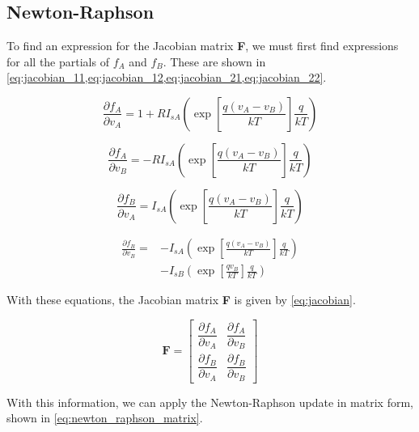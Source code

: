 \documentclass[a4paper,titlepage]{article}
\begin{document}
	
	\subsection{Newton-Raphson}
	
	To find an expression for the Jacobian matrix \textbf{F}, we must first find expressions for all the partials of $f_A$ and $f_B$. These are shown in \cref{eq:jacobian_11,eq:jacobian_12,eq:jacobian_21,eq:jacobian_22}.
	
	\begin{equation} \label{eq:jacobian_11}
		\frac{\partial f_A}{\partial v_A} = 1 + R I_{sA} \left( \exp\left[{\frac{q(v_A - v_B)}{kT}}\right]\frac{q}{kT}\right)
	\end{equation}
	
	\begin{equation} \label{eq:jacobian_12}
		\frac{\partial f_A}{\partial v_B} = - R I_{sA} \left( \exp\left[{\frac{q(v_A - v_B)}{kT}}\right]\frac{q}{kT}\right)
	\end{equation}
	
	\begin{equation} \label{eq:jacobian_21}
		\frac{\partial f_B}{\partial v_A} = I_{sA} \left( \exp\left[{\frac{q(v_A - v_B)}{kT}}\right]\frac{q}{kT}\right)
	\end{equation}
	
	\begin{equation} \label{eq:jacobian_22}
	\begin{split}
		\frac{\partial f_B}{\partial v_B} = &-I_{sA} \left( \exp\left[{\frac{q(v_A - v_B)}{kT}}\right]\frac{q}{kT}\right) \\
		&- I_{sB} \left( \exp\left[{\frac{qv_B}{kT}}\right]\frac{q}{kT}\right)
	\end{split}
	\end{equation}
	
	With these equations, the Jacobian matrix \textbf{F} is given by \cref{eq:jacobian}.
	
	\begin{equation} \label{eq:jacobian}
		\textbf{F} = 
		\begin{bmatrix}
		\dfrac{\partial f_A}{\partial v_A} & \dfrac{\partial f_A}{\partial v_B} \\[2ex]
		\dfrac{\partial f_B}{\partial v_A} & \dfrac{\partial f_B}{\partial v_B}
		\end{bmatrix}
	\end{equation}
	
	With this information, we can apply the Newton-Raphson update in matrix form, shown in \cref{eq:newton_raphson_matrix}.
	
\end{document}
